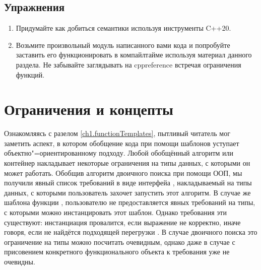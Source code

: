 \subsection*{Упражнения}
\begin{enumerate}
\item Придумайте как добиться семантики  используя инструменты C++20.
\item Возьмите произвольный модуль написанного вами кода и попробуйте заставить его функционировать в компайлтайме используя материал данного раздела.
Не забывайте заглядывать на cppreference встречая ограничения  функций.
\end{enumerate}

\section{Ограничения и концепты}
Ознакомляясь с разелом \ref{ch1.functionTemplates}, пытливый читатель мог заметить аспект, в котором обобщение кода при помощи шаблонов уступает объектно"=ориентированному подходу.
Любой обобщённый алгоритм или контейнер накладывает некоторые ограничения на типы данных, с которыми он может работать.
Обобщив алгоритм двоичного поиска при помощи ООП, мы получили явный список требований в виде интерфейа \hyperref[ch1.icomparable]{}, накладываемый на типы данных, с которыми пользователь захочет запустить этот алгоритм.
В случае же шаблона функции \hyperref[ch1.binarySearchTemplate]{}, пользователю не предоставляется явных требований на типы, с которыми можно инстанцировать этот шаблон.
Однако требования эти существуют: инстанциация провалится, если выражение  не корректно, иначе говоря, если не найдётся подходящей перегрузки .
В случае двоичного поиска это ограничение на типы можно посчитать очевидным, однако даже в случае с присовением конкретного функционального объекта к  требования уже не очевидны.

